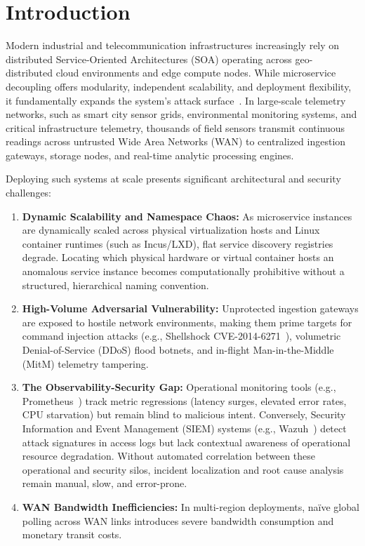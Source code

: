 \section{Introduction}
\label{sec:introduction}

Modern industrial and telecommunication infrastructures increasingly rely on distributed Service-Oriented Architectures (SOA) operating across geo-distributed cloud environments and edge compute nodes. While microservice decoupling offers modularity, independent scalability, and deployment flexibility, it fundamentally expands the system's attack surface~\citep{saltzer1975protection}. In large-scale telemetry networks, such as smart city sensor grids, environmental monitoring systems, and critical infrastructure telemetry, thousands of field sensors transmit continuous readings across untrusted Wide Area Networks (WAN) to centralized ingestion gateways, storage nodes, and real-time analytic processing engines.

Deploying such systems at scale presents significant architectural and security challenges:
\begin{enumerate}
    \item \textbf{Dynamic Scalability and Namespace Chaos:} As microservice instances are dynamically scaled across physical virtualization hosts and Linux container runtimes (such as Incus/LXD), flat service discovery registries degrade. Locating which physical hardware or virtual container hosts an anomalous service instance becomes computationally prohibitive without a structured, hierarchical naming convention.
    \item \textbf{High-Volume Adversarial Vulnerability:} Unprotected ingestion gateways are exposed to hostile network environments, making them prime targets for command injection attacks (e.g., Shellshock CVE-2014-6271~\citep{cve20146271}), volumetric Denial-of-Service (DDoS) flood botnets, and in-flight Man-in-the-Middle (MitM) telemetry tampering.
    \item \textbf{The Observability-Security Gap:} Operational monitoring tools (e.g., Prometheus~\citep{prometheus2026}) track metric regressions (latency surges, elevated error rates, CPU starvation) but remain blind to malicious intent. Conversely, Security Information and Event Management (SIEM) systems (e.g., Wazuh~\citep{wazuh2026}) detect attack signatures in access logs but lack contextual awareness of operational resource degradation. Without automated correlation between these operational and security silos, incident localization and root cause analysis remain manual, slow, and error-prone.
    \item \textbf{WAN Bandwidth Inefficiencies:} In multi-region deployments, naïve global polling across WAN links introduces severe bandwidth consumption and monetary transit costs.
\end{enumerate}

